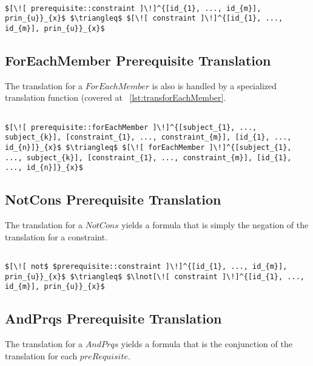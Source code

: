 \lstset{mathescape, language=AST}  
\begin{lstlisting}[frame=single, caption={Prerequisite Translation {$\colon$} Constraint},label={lst:transpreRequisiteConstraint}]

$[\![ prerequisite::constraint ]\!]^{[id_{1}, ..., id_{m}], prin_{u}}_{x}$ $\triangleq$ $[\![ constraint ]\!]^{[id_{1}, ..., id_{m}], prin_{u}}_{x}$ 
\end{lstlisting}

\subsection{ForEachMember Prerequisite Translation}
The translation for a $ForEachMember$ is also is handled by a specialized translation function (covered at ~\ref{lst:transforEachMember}.

\lstset{mathescape, language=AST}  
\begin{lstlisting}[frame=single, caption={Prerequisite Translation {$\colon$} ForEachMember},label={lst:transpreRequisiteForEachMember}]

$[\![ prerequisite::forEachMember ]\!]^{[subject_{1}, ..., subject_{k}], [constraint_{1}, ..., constraint_{m}], [id_{1}, ..., id_{n}]}_{x}$ $\triangleq$ $[\![ forEachMember ]\!]^{[subject_{1}, ..., subject_{k}], [constraint_{1}, ..., constraint_{m}], [id_{1}, ..., id_{n}]}_{x}$ 	
\end{lstlisting}

\subsection{NotCons Prerequisite Translation}
The translation for a $NotCons$ yields a formula that is simply the negation of the translation for a constraint.

\lstset{mathescape, language=AST}  
\begin{lstlisting}[frame=single, caption={Prerequisite Translation {$\colon$} Not Constraint},label={lst:transpreRequisiteNotConstraint}]

$[\![ not$ $prerequisite::constraint ]\!]^{[id_{1}, ..., id_{m}], prin_{u}}_{x}$ $\triangleq$ $\lnot[\![ constraint ]\!]^{[id_{1}, ..., id_{m}], prin_{u}}_{x}$ 
\end{lstlisting}

\subsection{AndPrqs Prerequisite Translation}
The translation for a $AndPrqs$ yields a formula that is the conjunction of the translation for each $preRequisite$.

